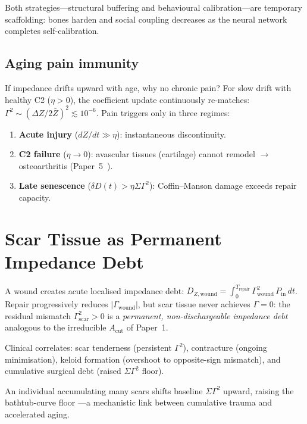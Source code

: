 \documentclass[aps,pre,twocolumn,superscriptaddress,floatfix]{revtex4-2}
\begin{document}
Both strategies---structural buffering and behavioural
calibration---are temporary scaffolding: bones harden
and social coupling decreases as the neural network
completes self-calibration.


\subsection{Aging pain immunity}
\label{sec:aging-pain}

If impedance drifts upward with age, why no chronic pain?
For slow drift with healthy C2 ($\eta > 0$),
the coefficient update continuously re-matches:
$\Gamma^2 \sim (\Delta Z / 2\bar{Z})^2 \lesssim 10^{-6}$.
Pain triggers only in three regimes:
\begin{enumerate}
  \item \textbf{Acute injury} ($dZ/dt \gg \eta$):
    instantaneous discontinuity.
  \item \textbf{C2 failure} ($\eta \to 0$):
    avascular tissues (cartilage) cannot remodel
    $\to$ osteoarthritis (Paper~5~\cite{Paper5}).
  \item \textbf{Late senescence}
    ($\delta D(t) > \eta\Sigma\Gamma^2$):
    Coffin--Manson damage exceeds repair capacity.
\end{enumerate}


\section{Scar Tissue as Permanent Impedance Debt}
\label{sec:scar-debt}

A wound creates acute localised impedance debt:
$D_{Z,\text{wound}} = \int_0^{T_{\text{repair}}}
\Gamma_{\text{wound}}^2\,P_{\text{in}}\,dt$.
Repair progressively reduces $|\Gamma_{\text{wound}}|$,
but scar tissue never achieves $\Gamma = 0$:
the residual mismatch $\Gamma_{\text{scar}}^2 > 0$
is a \emph{permanent, non-dischargeable impedance debt}
analogous to the irreducible $A_{\text{cut}}$ of Paper~1.

Clinical correlates: scar tenderness (persistent $\Gamma^2$),
contracture (ongoing minimisation), keloid formation
(overshoot to opposite-sign mismatch),
and cumulative surgical debt (raised $\Sigma\Gamma^2$ floor).

\begin{remark}
An individual accumulating many scars shifts baseline
$\Sigma\Gamma^2$ upward, raising the bathtub-curve floor
---a mechanistic link between cumulative trauma and
accelerated aging.
\end{remark}
\end{document}
